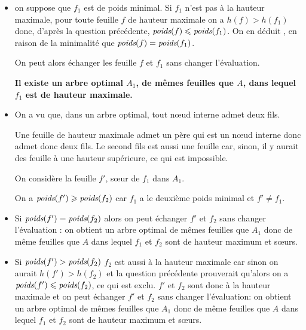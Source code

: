 \begin{Answer}
\begin{itemize}
\item on suppose que $f_1$ est de poids minimal. Si $f_1$ n'est pas à la hauteur maximale, pour toute feuille $f$ de hauteur maximale on a $h(f) > h(f_1)$ donc, d'après la question précédente, $\text{\it poids}(f) \le \text{\it poids}(f_1)$. On en déduit , en raison de la minimalité que $\text{\it poids}(f) = \text{\it poids}(f_1)$.

On peut alors échanger les feuille $f$ et $f_1$ sans changer l'évaluation.

{\bf Il existe un arbre optimal $A_1$, de mêmes feuilles que $A$, dans lequel $f_1$ est de hauteur maximale.}
\item On a vu que, dans un arbre optimal, tout nœud interne admet deux fils. 

Une feuille de hauteur maximale admet un père qui est un nœud interne donc admet donc deux fils. Le second fils est aussi une feuille car, sinon, il y aurait des feuille à une hauteur supérieure, ce qui est impossible.

On considère la feuille $f'$, sœur de $f_1$ dans $A_1$.

On a $\text{\it poids}(f') \ge \text{\it poids}(f_2)$ car $f_1$ a le deuxième poids minimal et $f'\ne f_1$.

\item Si $\text{\it poids}(f') =  \text{\it poids}(f_2)$ alors on peut échanger $f'$ et $f_2$ sans changer l'évaluation : on obtient un arbre optimal de mêmes feuilles que $A_1$ donc de même feuilles que $A$ dans lequel $f_1$ et $f_2$ sont de hauteur maximum et sœurs.

\item Si $\text{\it poids}(f') >  \text{\it poids}(f_2)$ $f_2$ est aussi à la hauteur maximale car sinon on aurait 
$h(f') > h(f_2)$ et la question précédente prouverait qu'alors on a $\text{\it poids}(f') \le \text{\it poids}(f_2)$, ce qui est exclu. $f'$ et $f_2$ sont donc à la hauteur maximale et on peut échanger $f'$ et $f_2$ sans changer l'évaluation: on obtient un arbre optimal de mêmes feuilles que $A_1$ donc de même feuilles que $A$ dans lequel $f_1$ et $f_2$ sont de hauteur maximum et sœurs.
\end{itemize}
\end{Answer}
\medskip

